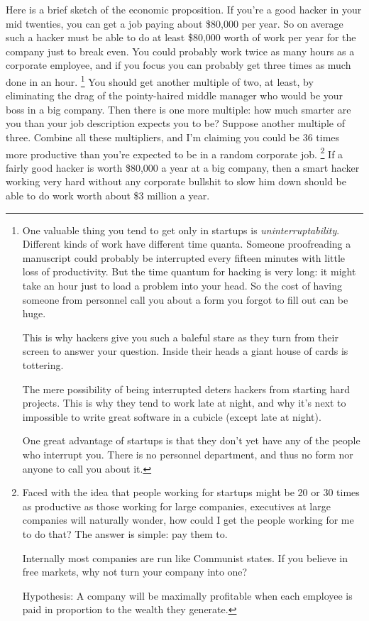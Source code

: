 \documentclass[12pt]{book}
\begin{document}
Here is a brief sketch of the economic proposition. If you're a good
hacker in your mid twenties, you can get a job paying about \$80,000 per
year. So on average such a hacker must be able to do at least \$80,000
worth of work per year for the company just to break even. You could
probably work twice as many hours as a corporate employee, and if you
focus you can probably get three times as much done in an hour.
\footnote{One valuable thing you tend to get only in startups is
\emph{uninterruptability}. Different kinds of work have different time
quanta. Someone proofreading a manuscript could probably be interrupted
every fifteen minutes with little loss of productivity. But the time
quantum for hacking is very long: it might take an hour just to load a
problem into your head. So the cost of having someone from personnel
call you about a form you forgot to fill out can be huge.

This is why hackers give you such a baleful stare as they turn from
their screen to answer your question. Inside their heads a giant house
of cards is tottering.

The mere possibility of being interrupted deters hackers from starting
hard projects. This is why they tend to work late at night, and why it's
next to impossible to write great software in a cubicle (except late at
night).

One great advantage of startups is that they don't yet have any of the
people who interrupt you. There is no personnel department, and thus no
form nor anyone to call you about it.} You should get another multiple of two, at
least, by eliminating the drag of the pointy-haired middle manager who
would be your boss in a big company. Then there is one more multiple:
how much smarter are you than your job description expects you to be?
Suppose another multiple of three. Combine all these multipliers, and
I'm claiming you could be 36 times more productive than you're expected
to be in a random corporate job. \footnote{Faced with the idea that people working for startups might be 20
or 30 times as productive as those working for large companies,
executives at large companies will naturally wonder, how could I get the
people working for me to do that? The answer is simple: pay them to.

Internally most companies are run like Communist states. If you believe
in free markets, why not turn your company into one?

Hypothesis: A company will be maximally profitable when each employee is
paid in proportion to the wealth they generate.} If a fairly
good hacker is worth \$80,000 a year at a big company, then a smart
hacker working very hard without any corporate bullshit to slow him down
should be able to do work worth about \$3 million a year.
\end{document}
